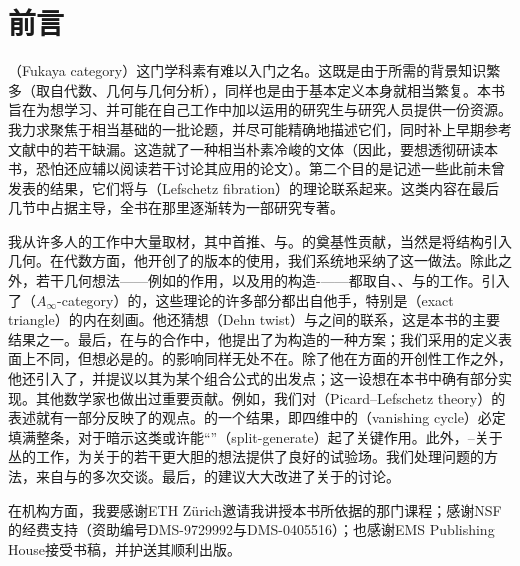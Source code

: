 \chapter*{前言}

\textbf{\trFukayaCategory}（Fukaya category）这门学科素有难以入门之名。这既是由于所需的背景知识繁多（取自\trHomology{}代数、\trSymplectic{}几何与几何分析），同样也是由于基本定义本身就相当繁复。本书旨在为想学习\trFukayaCategory、并可能在自己工作中加以运用的研究生与研究人员提供一份资源。我力求聚焦于相当基础的一批论题，并尽可能精确地描述它们，同时补上早期参考文献中的若干缺漏。这造就了一种相当朴素冷峻的文体（因此，要想透彻研读本书，恐怕还应辅以阅读若干讨论其应用的论文）。第二个目的是记述一些此前未曾发表的结果，它们将\trFukayaCategory{}与\textbf{\trLefschetzFibration}（Lefschetz fibration）的理论联系起来。这类内容在最后几节中占据主导，全书在那里逐渐转为一部研究专著。

我从许多人的工作中大量取材，其中首推\trFukaya、\trKontsevich{}与\trDonaldson。\trFukaya{}的奠基性贡献，当然是将\trAinfty{}结构引入\trSymplectic{}几何。在代数方面，他开创了\trYonedaEmbedding{}的\trAinfty{}版本的使用，我们系统地采纳了这一做法。除此之外，若干几何想法——例如\trPinStructure{}的作用，以及用\trParametrization{}的\trModuliSpace{}构造\trAinfty-\trHomomorphism——都取自\trFukaya、\trOh、\trOhta{}与\trOno{}的工作。\trKontsevich{}引入了\textbf{\trACategory}（$A_\infty$-category）的\trDerivedCategory，这些\trCategory{}理论的许多部分都出自他手，特别是\textbf{\trExactTriangle}（exact triangle）的内在刻画。他还猜想\textbf{\trDehnTwist}（Dehn twist）与\trTwistFunctor{}之间的联系，这是本书的主要结果之一。最后，在与\trBarannikov{}的合作中，他提出了为\trLefschetzFibration{}构造\trFukayaCategory{}的一种方案；我们采用的定义表面上不同，但想必是\trEquivalence{}的。\trDonaldson{}的影响同样无处不在。除了他在\trLefschetzPencil{}方面的开创性工作之外，他还引入了\trMatchingCycle，并提议以其为\trFloerCohomology{}某个组合公式的出发点；这一设想在本书中确有部分实现。其他数学家也做出过重要贡献。例如，我们对\textbf{\trPicardLefschetzTheory}（Picard--Lefschetz theory）的表述就有一部分反映了\trAuroux{}的观点。\trSmith{}的一个结果，即四维\trLefschetzPencil{}中的\trVanishingCycle（vanishing cycle）必定填满整条\trFiber，对于暗示这类\trCycle{}或许能“\trSplitGeneration”（split-generate）\trFukayaCategory{}起了关键作用。此外，\trFukaya--\trSmith{}关于\trCotangent{}丛的工作，为关于\trLefschetzFibration{}的若干更大胆的想法提供了良好的试验场。我们处理\trTransversality{}问题的方法，来自与\trLazzarini{}的多次交谈。最后，\trAbouzaid{}的建议大大改进了关于\trSymplectic\trEmbedding{}的讨论。

在机构方面，我要感谢ETH Zürich邀请我讲授本书所依据的那门课程；感谢NSF的经费支持（资助编号DMS-9729992与DMS-0405516）；也感谢EMS Publishing House接受书稿，并护送其顺利出版。

